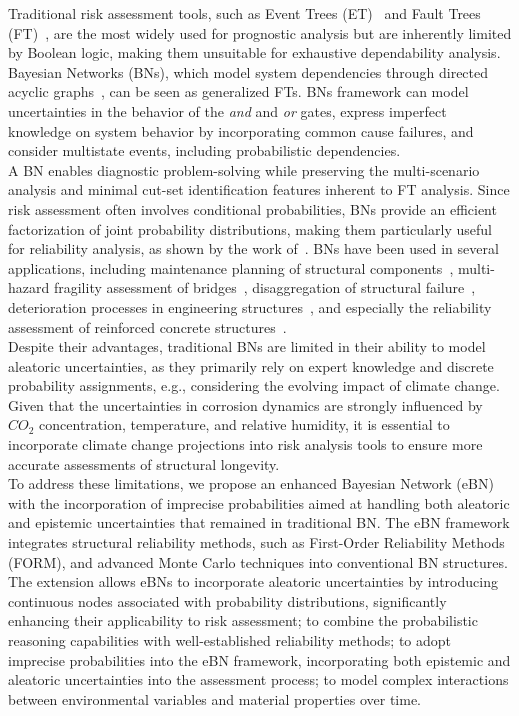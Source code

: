 Traditional risk assessment tools, such as Event Trees (ET)~\cite{papazoglou_mathematical_1998} and Fault Trees (FT)~\cite{kabir_overview_2017}, are the most widely used for prognostic analysis but are inherently limited by Boolean logic, making them unsuitable for exhaustive dependability analysis.
Bayesian Networks (BNs), which model system dependencies through directed acyclic graphs~\cite{mahadevan2001bayesian}, can be seen as generalized FTs.
BNs framework can model uncertainties in the behavior of the \textit{and} and \textit{or} gates, express imperfect knowledge on system behavior by incorporating common cause failures, and consider multistate events, including probabilistic dependencies. \\
A BN enables diagnostic problem-solving while preserving the multi-scenario analysis and minimal cut-set identification features inherent to FT analysis.
Since risk assessment often involves conditional probabilities, BNs provide an efficient factorization of joint probability distributions, making them particularly useful for reliability analysis, as shown by the work of~\textcite{langseth_bayesian_2007}.
BNs have been used in several applications, including maintenance planning of structural components~\cite{morato2022optimal}, multi-hazard fragility assessment of bridges~\cite{gehl2016development, barros2024gaussian}, disaggregation of structural failure~\cite{yazdani2020bayesian}, deterioration processes in engineering structures~\cite{luque2019risk,lee2023dynamic,tran2020dynamic}, and especially the reliability assessment of reinforced concrete structures~\cite{hackl2016reliability,hosseini2024dynamic,guo2024mixed}.\\
Despite their advantages, traditional BNs are limited in their ability to model aleatoric uncertainties, as they primarily rely on expert knowledge and discrete probability assignments, e.g., considering the evolving impact of climate change. Given that the uncertainties in corrosion dynamics are strongly influenced by $CO_2$ concentration, temperature, and relative humidity, it is essential to incorporate climate change projections into risk analysis tools to ensure more accurate assessments of structural longevity.\\
To address these limitations, we propose an enhanced Bayesian Network (eBN) with the incorporation of imprecise probabilities aimed at handling both aleatoric and epistemic uncertainties that remained in traditional BN.
The eBN framework integrates structural reliability methods, such as First-Order Reliability Methods (FORM), and advanced Monte Carlo techniques into conventional BN structures. The extension allows eBNs to incorporate aleatoric uncertainties by introducing continuous nodes associated with probability distributions, significantly enhancing their applicability to risk assessment; to combine the probabilistic reasoning capabilities with well-established reliability methods; to adopt imprecise probabilities into the eBN framework, incorporating both epistemic and aleatoric uncertainties into the assessment process; to model complex interactions between environmental variables and material properties over time.
